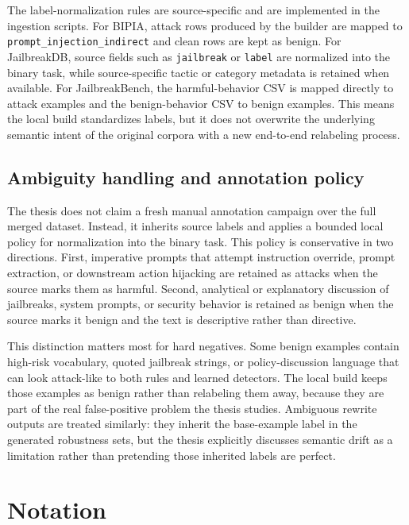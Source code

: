 

The label-normalization rules are source-specific and are implemented in the ingestion scripts. For BIPIA, attack rows produced by the builder are mapped to \texttt{prompt\_injection\_indirect} and clean rows are kept as benign. For JailbreakDB, source fields such as \texttt{jailbreak} or \texttt{label} are normalized into the binary task, while source-specific tactic or category metadata is retained when available. For JailbreakBench, the harmful-behavior CSV is mapped directly to attack examples and the benign-behavior CSV to benign examples. This means the local build standardizes labels, but it does not overwrite the underlying semantic intent of the original corpora with a new end-to-end relabeling process.

\subsection{Ambiguity handling and annotation policy}

The thesis does not claim a fresh manual annotation campaign over the full merged dataset. Instead, it inherits source labels and applies a bounded local policy for normalization into the binary task. This policy is conservative in two directions. First, imperative prompts that attempt instruction override, prompt extraction, or downstream action hijacking are retained as attacks when the source marks them as harmful. Second, analytical or explanatory discussion of jailbreaks, system prompts, or security behavior is retained as benign when the source marks it benign and the text is descriptive rather than directive.

This distinction matters most for hard negatives. Some benign examples contain high-risk vocabulary, quoted jailbreak strings, or policy-discussion language that can look attack-like to both rules and learned detectors. The local build keeps those examples as benign rather than relabeling them away, because they are part of the real false-positive problem the thesis studies. Ambiguous rewrite outputs are treated similarly: they inherit the base-example label in the generated robustness sets, but the thesis explicitly discusses semantic drift as a limitation rather than pretending those inherited labels are perfect.

\section{Notation}

